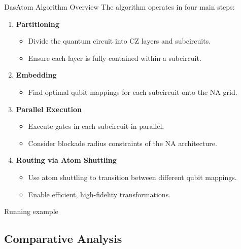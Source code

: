 \documentclass{beamer}
\begin{document}
\begin{frame}{DasAtom Algorithm Overview}
  The algorithm operates in four main steps:

  \begin{enumerate}
    \item \textbf{Partitioning}
      \begin{itemize}
        \item Divide the quantum circuit into CZ layers and subcircuits.
        \item Ensure each layer is fully contained within a subcircuit.
      \end{itemize}
    \item \textbf{Embedding}
      \begin{itemize}
        \item Find optimal qubit mappings for each subcircuit onto the NA grid.
      \end{itemize}
    \item \textbf{Parallel Execution}
      \begin{itemize}
        \item Execute gates in each subcircuit in parallel.
        \item Consider blockade radius constraints of the NA architecture.
      \end{itemize}
    \item \textbf{Routing via Atom Shuttling}
      \begin{itemize}
        \item Use atom shuttling to transition between different qubit mappings.
        \item Enable efficient, high-fidelity transformations.
      \end{itemize}
  \end{enumerate}

\end{frame}
\begin{frame}{Running example}
    \centering
  \scalebox{0.5}{}
  \scalebox{0.5}{}
  \scalebox{0.5}{}
  \scalebox{0.5}{}
\end{frame}
\subsection{Comparative Analysis}
\end{document}
